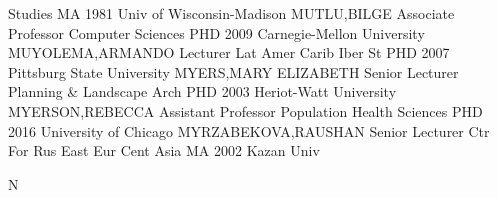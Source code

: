 \documentclass[
]{article}
\begin{document}
Studies \textbar MA 1981 Univ of Wisconsin-Madison \textbar MUTLU,BILGE
\textbar{}  \textbar Associate Professor \textbar Computer
Sciences \textbar PHD 2009 Carnegie-Mellon University
\textbar MUYOLEMA,ARMANDO \textbar{}  \textbar Lecturer
\textbar Lat Amer Carib Iber St \textbar PHD 2007 Pittsburg State
University \textbar MYERS,MARY ELIZABETH \textbar{} 
\textbar Senior Lecturer \textbar Planning \& Landscape Arch
\textbar PHD 2003 Heriot-Watt University \textbar MYERSON,REBECCA
\textbar{}  \textbar Assistant Professor \textbar Population
Health Sciences \textbar PHD 2016 University of Chicago
\textbar MYRZABEKOVA,RAUSHAN \textbar{}  \textbar Senior
Lecturer \textbar Ctr For Rus East Eur Cent Asia \textbar MA 2002 Kazan
Univ \textbar{}

N

\textbar{}  \textbar{}
\end{document}
